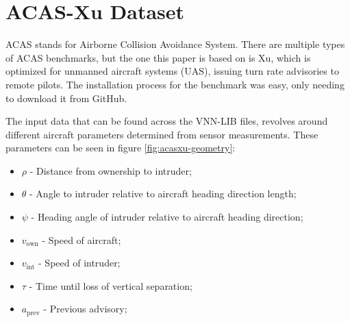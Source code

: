 \section{ACAS-Xu Dataset}
\label{sect:acasxu}

ACAS stands for Airborne Collision Avoidance System. There are multiple types of ACAS benchmarks, but the one this paper is based on is Xu, which is optimized for unmanned aircraft systems (UAS), issuing turn rate advisories to remote pilots\cite{katz2017reluplex}. The installation process for the benchmark was easy, only needing to download it from GitHub\footnotemark[1].

The input data that can be found across the VNN-LIB files, revolves around different aircraft parameters determined from sensor measurements\cite{kochenderfer2011robust}. These parameters can be seen in figure \ref{fig:acasxu-geometry}:
\begin{itemize}
  \item \(\rho\) - Distance from ownership to intruder;
  \item \(\theta\) - Angle to intruder relative to aircraft heading direction length;
  \item \(\psi\) - Heading angle of intruder relative to aircraft heading direction;
  \item \(v_{\text{own}}\) - Speed of aircraft;
  \item \(v_{\text{int}}\) - Speed of intruder;
  \item \(\tau\) - Time until loss of vertical separation;
  \item \(a_{\text{prev}}\) - Previous advisory;
\end{itemize}

